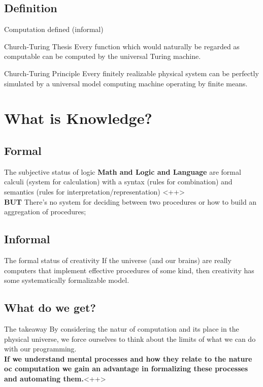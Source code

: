 \documentclass{beamer}
\begin{document}
\subsection{Definition}
\begin{frame}{Computation defined (informal)}
\begin{exampleblock}{\sc Church-Turing Thesis}
Every function which would naturally be regarded as computable can be computed by the universal Turing machine.
\end{exampleblock}

\begin{block}{Church-Turing Principle}
  Every finitely realizable physical system can be perfectly simulated by a universal model computing machine operating by finite means.
\end{block}
 \end{frame}\label{informal}


\section{What is Knowledge?}
\subsection{Formal}
\begin{frame}{The subjective status of logic}
  \textbf{Math and Logic and Language} are formal calculi (system for calculation) with a syntax (rules for combination) and semantics (rules for interpretation/representation) <++>
\\
\pause
{\bf BUT}
There's no system for deciding between two procedures or how to build an aggregation of procedures; 
\end{frame}

\subsection{Informal}
\begin{frame}{The formal status of creativity}
  If the universe (and our brains) are really computers that implement effective procedures of some kind, then creativity has some systematically formalizable model.
\end{frame}

\subsection{What do we get?}
\begin{frame}{The takeaway}
  By considering the natur of computation and its place in the physical universe, we force ourselves to think about the limits of what we can do with our programming.\\
  {\bf If we understand mental processes and how they relate to the nature oc computation we gain an advantage in formalizing these processes and automating them.}<++>
\end{frame}

\end{document}
